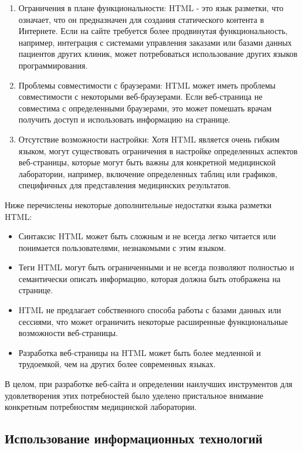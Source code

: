 \begin{enumerate}
	\item Ограничения в плане функциональности: HTML - это язык разметки, что означает, что он предназначен для создания статического контента в Интернете. Если на сайте требуется более продвинутая функциональность, например, интеграция с системами управления заказами или базами данных пациентов других клиник, может потребоваться использование других языков программирования.
	\item Проблемы совместимости с браузерами: HTML может иметь проблемы совместимости с некоторыми веб-браузерами. Если веб-страница не совместима с определенными браузерами, это может помешать врачам получить доступ и использовать информацию на странице.
	\item Отсутствие возможности настройки: Хотя HTML является очень гибким языком, могут существовать ограничения в настройке определенных аспектов веб-страницы, которые могут быть важны для конкретной медицинской лаборатории, например, включение определенных таблиц или графиков, специфичных для представления медицинских результатов.
\end{enumerate}

Ниже перечислены некоторые дополнительные недостатки языка разметки HTML:

\begin{itemize}
	\item Синтаксис HTML может быть сложным и не всегда легко читается или понимается пользователями, незнакомыми с этим языком.
	\item Теги HTML могут быть ограниченными и не всегда позволяют полностью и семантически описать информацию, которая должна быть отображена на странице.
	\item HTML не предлагает собственного способа работы с базами данных или сессиями, что может ограничить некоторые расширенные функциональные возможности веб-страницы.
	\item Разработка веб-страницы на HTML может быть более медленной и трудоемкой, чем на других более современных языках.
\end{itemize}

В целом, при разработке веб-сайта и определении наилучших инструментов для удовлетворения этих потребностей было уделено пристальное внимание конкретным потребностям медицинской лаборатории.

\subsection{Использование информационных технологий}

